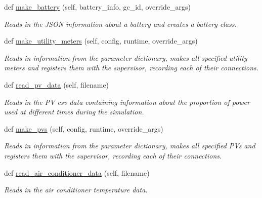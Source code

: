 \begin{DoxyCompactItemize}
def \hyperlink{class_build_1_1_simulation___operation_1_1simulation_1_1_simulation_setup_a39338a11ff1a79a8d628f074d2b35b99}{make\+\_\+battery} (self, battery\+\_\+info, gc\+\_\+id, override\+\_\+args)
\begin{DoxyCompactList}\small\item\em Reads in the J\+S\+ON information about a battery and creates a battery class. \end{DoxyCompactList}\item 
def \hyperlink{class_build_1_1_simulation___operation_1_1simulation_1_1_simulation_setup_aaab107d97bd6080dee5ddb95e57346af}{make\+\_\+utility\+\_\+meters} (self, config, runtime, override\+\_\+args)
\begin{DoxyCompactList}\small\item\em Reads in information from the parameter dictionary, makes all specified utility meters and registers them with the supervisor, recording each of their connections. \end{DoxyCompactList}\item 
def \hyperlink{class_build_1_1_simulation___operation_1_1simulation_1_1_simulation_setup_a230e156e1023bed3e0c80510989a98ff}{read\+\_\+pv\+\_\+data} (self, filename)
\begin{DoxyCompactList}\small\item\em Reads in the PV csv data containing information about the proportion of power used at different times during the simulation. \end{DoxyCompactList}\item 
def \hyperlink{class_build_1_1_simulation___operation_1_1simulation_1_1_simulation_setup_ae27369e558bd5994d0288113e1d617fa}{make\+\_\+pvs} (self, config, runtime, override\+\_\+args)
\begin{DoxyCompactList}\small\item\em Reads in information from the parameter dictionary, makes all specified PV\textquotesingle{}s and registers them with the supervisor, recording each of their connections. \end{DoxyCompactList}\item 
def \hyperlink{class_build_1_1_simulation___operation_1_1simulation_1_1_simulation_setup_a05dcf54f3c290997fe904079bf438e12}{read\+\_\+air\+\_\+conditioner\+\_\+data} (self, filename)
\begin{DoxyCompactList}\small\item\em Reads in the air conditioner temperature data. \end{DoxyCompactList}\item 

\end{DoxyCompactItemize}
